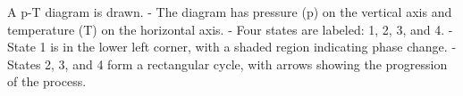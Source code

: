 A p-T diagram is drawn.  
- The diagram has pressure (p) on the vertical axis and temperature (T) on the horizontal axis.  
- Four states are labeled: 1, 2, 3, and 4.  
- State 1 is in the lower left corner, with a shaded region indicating phase change.  
- States 2, 3, and 4 form a rectangular cycle, with arrows showing the progression of the process.